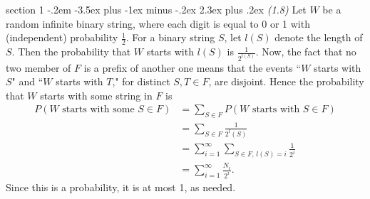 \documentclass[12pt]{article}
\makeatletter
\theoremstyle{norm}
\newcommand{\rc}[1]{\frac{1}{#1}}
\newenvironment{problem}{\@startsection
       {section}
       {1}
       {-.2em}
       {-3.5ex plus -1ex minus -.2ex}
       {2.3ex plus .2ex}
       {\pagebreak[3]%
       \large\bf\noindent{Problem }
       }
       }
       {%
       }
\makeatother
\begin{document}
\begin{problem} {\it (1.8)}
Let $W$ be a random infinite binary string, where each digit is equal to 0 or 1 with (independent) probability $\rc 2$. For a binary string $S$, let $l(S)$ denote the length of $S$. Then the probability that $W$ starts with $l(S)$ is $\rc{2^{l(S)}}$. Now, the fact that no two member of $F$ is a prefix of another one means that the events ``$W$ starts with $S$" and ``$W$ starts with $T$," for distinct $S,T\in F$, are disjoint. Hence the probability that $W$ starts with some string in $F$ is
\begin{align*}
P(W\text{ starts with some }S\in F)&=\sum_{S\in F} P(W\text{ starts with }S\in F)\\
&=\sum_{S\in F}\frac{1}{2^l(S)}\\
&=\sum_{i=1}^{\infty}\sum_{S\in F, \,l(S)=i}\rc{2^i}\\
&=\sum_{i=1}^{\infty} \frac{N_i}{2^i}.
\end{align*}
Since this is a probability, it is at most 1, as needed.
\end{problem}
\end{document}
